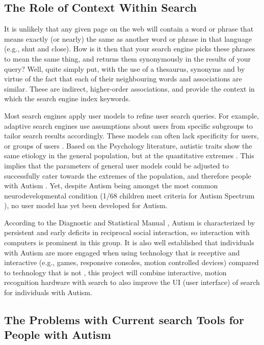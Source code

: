 \documentclass[a4paper, 10pt]{article}
\begin{document}
\subsection{The Role of Context Within Search} \label{the problem}
It is unlikely that any given page on the web will contain a word or phrase that means exactly (or nearly) the same as another word or phrase in that language (e.g., shut and close). How is it then that your search engine picks these phrases to mean the same thing, and returns them synonymously in the results of your query? Well, quite simply put, with the use of a thesaurus, synonyms and by virtue of the fact that each of their neighbouring words and associations are similar. These are indirect, higher-order associations, and provide the context in which the search engine index keywords.

Most search engines apply user models to refine user search queries. For example, adaptive search engines use assumptions about users from specific subgroups to tailor search results accordingly. These models can often lack specificity for users, or groups of users \cite{usermodel}.  Based on the Psychology literature, autistic traits show the same etiology in the general population, but at the quantitative extremes \cite{robinson}. This implies that the parameters of general user models could be adjusted to successfully cater towards the extremes of the population, and therefore people with Autism \cite{bonel}. Yet, despite Autism being amongst the most common neurodevelopmental condition (1/68 children meet criteria for Autism Spectrum \cite{CDC}), no user model has yet been developed for Autism. 

According to the Diagnostic and Statistical Manual \cite{CDC}, Autism is characterized by persistent and early deficits in reciprocal social interaction, so interaction with computers is prominent in this group. It is also well established that individuals with Autism are more engaged when using technology that is receptive and interactive (e.g., games, responsive consoles, motion controlled devices) compared to technology that is not \cite{motioncontrollerforautism}, this project will combine interactive, motion recognition hardware with search to also improve the UI (user interface) of search for individuals with Autism.

\subsection{The Problems with Current search Tools for People with Autism}\label{What should search offer people with Autism}
\end{document}

